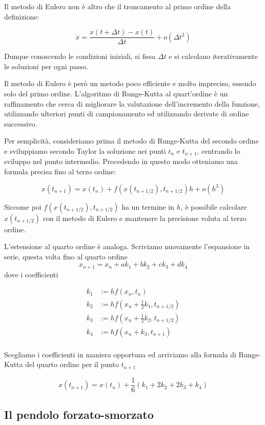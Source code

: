\documentclass[a4paper,10pt]{article}
\begin{document}
Il metodo di Eulero non è altro che il troncamento al primo ordine della definizione:

$$\dot{x} = \frac{x(t + \Delta t)-x(t)}{\Delta t} + o(\Delta t^2)$$

Dunque conoscendo le condizioni iniziali, si fissa $\Delta t$ e si calcolano iterativamente le soluzioni per ogni passo.

Il metodo di Eulero è però un metodo poco efficiente e molto impreciso, essendo solo del primo ordine. L'algoritmo di Runge-Kutta al quart'ordine è un raffinamento che cerca di migliorare la valutazione dell'incremento della funzione, utilizzando ulteriori punti di campionamento ed utilizzando derivate di ordine successivo.

Per semplicità, consideriamo prima il metodo di Runge-Kutta del secondo ordine e sviluppiamo secondo Taylor la soluzione nei punti $t_n$ e $t_{n+1}$, centrando lo sviluppo nel punto intermedio. Procedendo in questo modo otteniamo una formula precisa fino al terzo ordine:

$$ x(t_{n+1}) = x(t_n) + f(x(t_{n+1/2}), t_{n+1/2})h + o(h^3)$$

Siccome poi $f(x(t_{n+1/2}), t_{n+1/2})$ ha un termine in $h$, è possibile calcolare $x(t_{n+1/2})$ con il metodo di Eulero e mantenere la precisione voluta al terzo ordine.

L'estensione al quarto ordine è analoga. Scriviamo nuovamente l'espansione in serie, questa volta fino al quarto ordine
$$ x_{n+1} = x_n + ak_1 + bk_2 + ck_3 + dk_4$$
dove i coefficienti

$$\begin{array}{rl}
k_1 &:= hf(x_n, t_n) \\
k_2 &:= hf(x_n + \frac{1}{2}k_1, t_{n+1/2}) \\
k_3 &:= hf(x_n + \frac{1}{2}k_2, t_{n+1/2}) \\
k_4 &:= hf(x_n + k_3, t_{n+1}) \\
\end{array}$$

Scegliamo i coefficienti in maniera opportuna ed arriviamo alla formula di Runge-Kutta del quarto ordine per il punto $t_{n+1}$

$$x(t_{n+1}) = x(t_n) + \frac{1}{6}(k_1 + 2k_2 + 2k_3 + k_4)$$

\subsection{Il pendolo forzato-smorzato}
\end{document}
